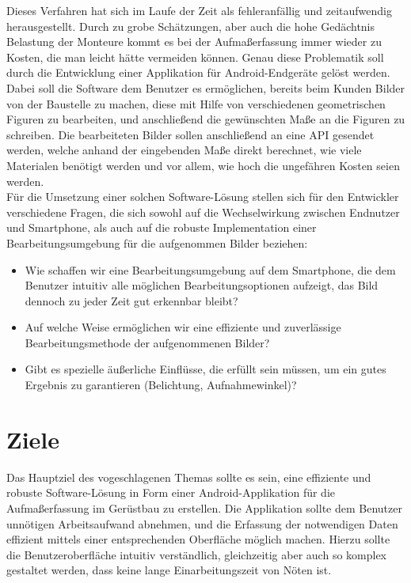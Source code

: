 \documentclass[a4paper]{article}
\begin{document}
Dieses Verfahren hat sich im Laufe der Zeit als fehleranfällig und zeitaufwendig herausgestellt.
Durch zu grobe Schätzungen, aber auch die hohe Gedächtnis Belastung der Monteure kommt es bei der Aufmaßerfassung immer wieder zu Kosten, die man leicht hätte vermeiden können.
Genau diese Problematik soll durch die Entwicklung einer Applikation für Android-Endgeräte gelöst werden. \\

Dabei soll die Software dem Benutzer es ermöglichen, bereits beim Kunden Bilder von der Baustelle zu machen, diese mit Hilfe von verschiedenen geometrischen Figuren zu bearbeiten, und anschließend die gewünschten Maße an die Figuren zu schreiben. 
Die bearbeiteten Bilder sollen anschließend an eine API gesendet werden, welche anhand der eingebenden Maße direkt berechnet, wie viele Materialen benötigt werden und vor allem, wie hoch die ungefähren Kosten seien werden.\\

Für die Umsetzung einer solchen Software-Lösung stellen sich für den Entwickler verschiedene Fragen, die sich sowohl auf die Wechselwirkung zwischen Endnutzer und Smartphone, als auch auf die robuste Implementation einer Bearbeitungsumgebung für die aufgenommen Bilder beziehen: \\

\begin{itemize}
	\item Wie schaffen wir eine Bearbeitungsumgebung auf dem Smartphone, die dem Benutzer intuitiv alle möglichen Bearbeitungsoptionen aufzeigt, das Bild dennoch zu jeder Zeit gut erkennbar bleibt?
	\item Auf welche Weise ermöglichen wir eine effiziente und zuverlässige Bearbeitungsmethode der aufgenommenen Bilder?
	\item Gibt es spezielle äußerliche Einflüsse, die erfüllt sein müssen, um ein gutes Ergebnis zu garantieren (Belichtung, Aufnahmewinkel)?
\end{itemize}

\newpage

\section*{Ziele}
Das Hauptziel des vogeschlagenen Themas sollte es sein, eine effiziente und robuste Software-Lösung in Form einer Android-Applikation für die Aufmaßerfassung im Gerüstbau zu erstellen. 
Die Applikation sollte dem Benutzer unnötigen Arbeitsaufwand abnehmen, und die Erfassung der notwendigen Daten effizient mittels einer entsprechenden Oberfläche möglich machen.
Hierzu sollte die Benutzeroberfläche intuitiv verständlich, gleichzeitig aber auch so komplex gestaltet werden, dass keine lange Einarbeitungszeit von Nöten ist.
\end{document}
